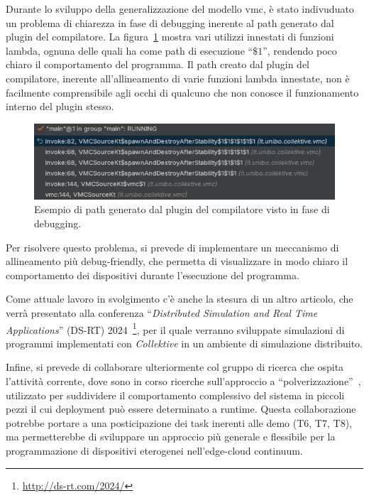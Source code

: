 \documentclass[13pt, a4paper]{article}
\newcommand{\ck}{\emph{Collektive}}
\begin{document}
Durante lo sviluppo della generalizzazione del modello \ac{vmc}, è stato indivuduato un problema di chiarezza in fase di debugging
inerente al path generato dal plugin del compilatore.
%
La figura~\ref{fig:alignment} mostra vari utilizzi innestati di funzioni lambda, ognuna delle quali ha come path di esecuzione
``$\$1$'', rendendo poco chiaro il comportamento del programma.
%
Il path creato dal plugin del compilatore, inerente all'allineamento di varie funzioni lambda innestate, non è facilmente comprensibile
agli occhi di qualcuno che non conosce il funzionamento interno del plugin stesso.
\begin{figure}
    \centering
    \includegraphics[width=\textwidth]{images/alignment}
    \caption{Esempio di path generato dal plugin del compilatore visto in fase di debugging.}
    \label{fig:alignment}
\end{figure}

Per risolvere questo problema, si prevede di implementare un meccanismo di allineamento più debug-friendly,
    che permetta di visualizzare in modo chiaro il comportamento dei dispositivi durante l'esecuzione del programma.

Come attuale lavoro in svolgimento c'è anche la stesura di un altro articolo, che verrà presentato alla conferenza
    ``\emph{Distributed Simulation and Real Time Applications}'' (DS-RT) 2024~\footnote{\url{http://ds-rt.com/2024/}},
    per il quale verranno sviluppate simulazioni di programmi implementati con \ck{} in un ambiente di simulazione distribuito.

Infine, si prevede di collaborare ulteriormente col gruppo di ricerca che ospita l'attività corrente,
dove sono in corso
    ricerche sull'approccio a ``polverizzazione''~\cite{fi12110203},
    utilizzato per suddividere il comportamento complessivo del sistema
in piccoli pezzi il cui deployment può essere determinato a runtime.
%
Questa collaborazione potrebbe portare a una posticipazione dei task inerenti alle demo (T6, T7, T8), ma permetterebbe di sviluppare
    un approccio più generale e flessibile per la programmazione di dispositivi eterogenei nell'edge-cloud continuum.





\end{document}
